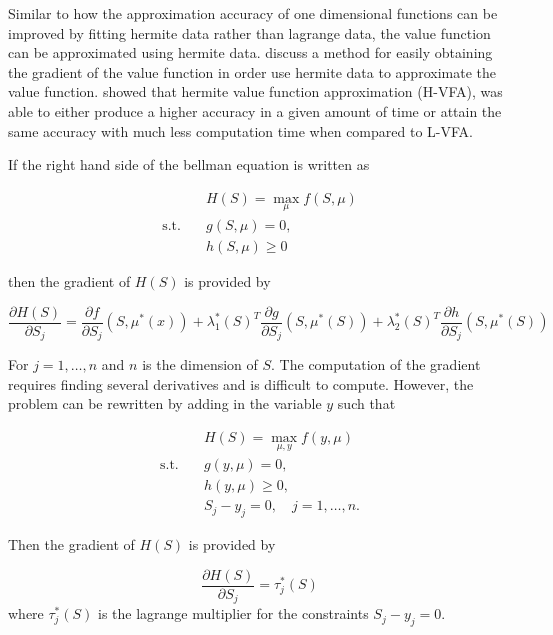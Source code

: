 \documentclass[12pt]{article}
\begin{document}
Similar to how the approximation accuracy of one dimensional functions can be improved by fitting hermite data rather than lagrange data, the value function can be approximated using hermite data. \citet{2015_Judd_Cai} discuss a method for easily obtaining the gradient of the value function in order use hermite data to approximate the value function. \citet{2015_Judd_Cai} showed that hermite value function approximation (H-VFA), was able to either produce a higher accuracy in a given amount of time or attain the same accuracy with much less computation time when compared to L-VFA.

If the right hand side of the bellman equation is written as

\begin{equation}
  \begin{aligned}
    & H(S)=\max_{\mu} f(S,\mu) \\
    \text{s.t.}\quad & g(S, \mu)=0,\\
    & h(S,\mu) \geq 0
  \end{aligned}
  \label{equationA}
\end{equation}

then the gradient of $H(S)$ is provided by

\begin{equation*}
  \frac{\partial H(S)}{\partial S_j} =\frac{\partial f}{\partial S_j}(S, \mu^*(x)) + \lambda_1^*(S)^T\frac{\partial g}{\partial S_j}(S, \mu^*(S)) + \lambda_2^*(S)^T\frac{\partial h}{\partial S_j}(S, \mu^*(S))
\end{equation*}

For $j=1,\dots,n$ and $n$ is the dimension of $S$. The computation of the gradient requires finding several derivatives and is difficult to compute. However, the problem can be rewritten by adding in the variable $y$ such that

\begin{equation}
  \begin{aligned}
    & H(S)=\max_{\mu,y} f(y,\mu) \\
    \text{s.t.}\quad & g(y, \mu)=0,\\
    & h(y,\mu) \geq 0,\\
    & S_j-y_j=0,\quad j=1,\dots,n.
  \end{aligned}
  \label{equationB}
\end{equation}

Then the gradient of $H(S)$ is provided by

\begin{equation*}
  \frac{\partial H(S)}{\partial S_j} = \tau^*_j(S)
\end{equation*}
where $\tau^*_j(S)$ is the lagrange multiplier for the constraints $S_j-y_j=0$.
\end{document}
